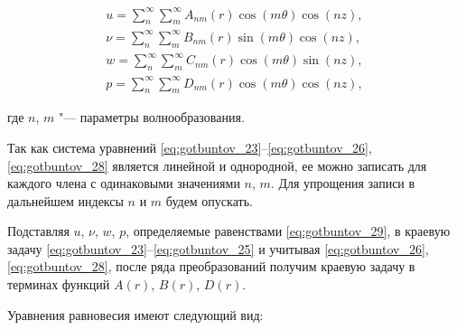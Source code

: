 \begin{equation}

\begin{array}{l}

\displaystyle

u=\sum_n^{\infty}\sum_m^{\infty}A_{nm}(r)\cos(m\theta)\cos(nz), \\[3mm]

\displaystyle

\nu=\sum_n^{\infty}\sum_m^{\infty}B_{nm}(r)\sin(m\theta)\cos(nz),

\\[3mm]

\displaystyle  

w=\sum_n^{\infty}\sum_m^{\infty}C_{nm}(r)\cos(m\theta)\sin(nz), \\[3mm]

\displaystyle

p=\sum_n^{\infty}\sum_m^{\infty}D_{nm}(r)\cos(m\theta)\cos(nz), 

\end{array} 

\label{eq:gotbuntov_29} 

\end{equation}

где $n$, $m$ "--- параметры волнообразования.



Так как система уравнений \eqref{eq:gotbuntov_23}--\eqref{eq:gotbuntov_26}, \eqref{eq:gotbuntov_28} является линейной и однородной,  ее можно записать для каждого члена с одинаковыми значениями $n$, $m$. Для упрощения записи в дальнейшем индексы $n$ и $m$ будем опускать. 



Подставляя $u$, $\nu$, $w$, $p$, определяемые равенствами \eqref{eq:gotbuntov_29}, в краевую задачу \eqref{eq:gotbuntov_23}--\eqref{eq:gotbuntov_25} и учитывая \eqref{eq:gotbuntov_26}, \eqref{eq:gotbuntov_28}, после ряда преобразований получим краевую задачу в терминах функций $A(r)$, $B(r)$, $D(r)$.



Уравнения равновесия имеют следующий вид:

